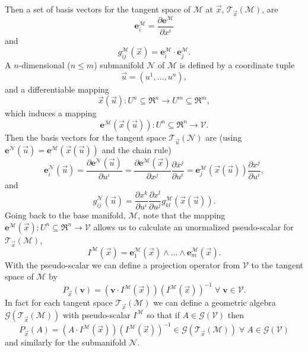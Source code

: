 \documentclass[12pt,twoside,openright]{memoir}
\newcommand{\bm}[1]{\boldsymbol{#1}}
\newcommand{\bfrac}[2]{\displaystyle\frac{#1}{#2}}
\newcommand{\lp}{\left (}
\newcommand{\rp}{\right )}
\newcommand{\pdiff}[2]{\bfrac{\partial {#1}}{\partial {#2}}}
\newcommand{\W}{\wedge}
\newcommand{\f}[2]{{#1}\lp {#2} \rp}
\newcommand{\paren}[1]{\lp {#1} \rp}
\newcommand{\be}{\begin{equation}}
\newcommand{\ee}{\end{equation}}
\newcommand{\eb}{\bm{e}}
\newcommand{\Tn}[2]{\f{\mathcal{T}_{#2}}{#1}}
\begin{document}
Then a set of basis vectors for the tangent space of $\mathcal{M}$ at $\vec{x}$, $\Tn{\mathcal{M}}{\vec{x}}$, are
\be
	\bm{e}_{i}^{\mathcal{M}} = \pdiff{\bm{e}^{\mathcal{M}}}{x^{i}}
\ee
and
\be
	\f{g_{ij}^{\mathcal{M}}}{\vec{x}} = \bm{e}_{i}^{\mathcal{M}}\cdot\bm{e}_{j}^{\mathcal{M}}.
\ee
A $n$-dimensional ($n\le m$) submanifold $\mathcal{N}$ of $\mathcal{M}$ is defined by a coordinate tuple
\be
	\vec{u} = \paren{u^{1},\dots,u^{n}},
\ee 
and a differentiable mapping
\be\label{eq_79}
	\f{\vec{x}}{\vec{u}}\colon U^{n}\subseteq\Re^{n}\rightarrow U^{m}\subseteq\Re^{m},
\ee
which induces a mapping
\be
	\f{\bm{e}^{\mathcal{M}}}{\f{\vec{x}}{\vec{u}}}\colon U^{n}\subseteq\Re^{n}\rightarrow \mathcal{V}.
\ee
Then the basis vectors for the tangent space $\Tn{\mathcal{N}}{\vec{u}}$ are 
(using $\f{\eb^{\mathcal{N}}}{\vec{u}} = \f{\eb^{\mathcal{M}}}{\f{\vec{x}}{\vec{u}}}$ and the chain rule)
\be
	\f{\bm{e}_{i}^{\mathcal{N}}}{\vec{u}} = \pdiff{\f{\bm{e}^{\mathcal{N}}}{\vec{u}}}{u^{i}} 
	                                          = \pdiff{\f{\bm{e}^{\mathcal{M}}}{\vec{x}}}{x^{j}}\pdiff{x^{j}}{u^{i}}
	                                          = \f{\bm{e}_{j}^{\mathcal{M}}}{\f{\vec{x}}{\vec{u}}}\pdiff{x^{j}}{u^{i}},
\ee
and
\be\label{eq_81}
	\f{g_{ij}^{\mathcal{N}}}{\vec{u}} = \pdiff{x^{k}}{u^{i}}\pdiff{x^{l}}{u^{j}}
	                                        \f{g_{kl}^{\mathcal{M}}}{\f{\vec{x}}{\vec{u}}}.
\ee
Going back to the base manifold, $\mathcal{M}$, note that the mapping 
$\f{\bm{e}^{\mathcal{M}}}{\vec{x}}\colon U^{n}\subseteq\Re^{n}\rightarrow \mathcal{V}$ allows us to calculate an unormalized pseudo-scalar 
for $\Tn{\mathcal{M}}{\vec{x}}$,
\be
	\f{I^{\mathcal{M}}}{\vec{x}} = \f{\bm{e}_{1}^{\mathcal{M}}}{\vec{x}}
	                                   \W\dots\W\f{\bm{e}_{m}^{\mathcal{M}}}{\vec{x}}.
\ee
With the pseudo-scalar we can define a projection operator from $\mathcal{V}$
to the tangent space of $\mathcal{M}$ by
\be
	\f{P_{\vec{x}}}{\bm{v}} = (\bm{v}\cdot \f{I^{\mathcal{M}}}{\vec{x}})
	                          \paren{\f{I^{\mathcal{M}}}{\vec{x}}}^{-1} \;\forall\; \bm{v}\in\mathcal{V}.
\ee
In fact for each tangent space $\Tn{\mathcal{M}}{\vec{x}}$ we can define a geometric algebra 
$\f{\mathcal{G}}{\Tn{\mathcal{M}}{\vec{x}}}$ with pseudo-scalar $I^{\mathcal{M}}$ so that if
$A \in \f{\mathcal{G}}{\mathcal{V}}$ then
\be
	\f{P_{\vec{x}}}{A} = \paren{A\cdot \f{I^{\mathcal{M}}}{\vec{x}}}
	                     \paren{\f{I^{\mathcal{M}}}{\vec{x}}}^{-1} 
	                     \in \f{\mathcal{G}}{\Tn{\mathcal{M}}{\vec{x}}}\;\forall\; 
	                     A \in \f{\mathcal{G}}{\mathcal{V}}
\ee
and similarly for the submanifold $\mathcal{N}$.
\end{document}
